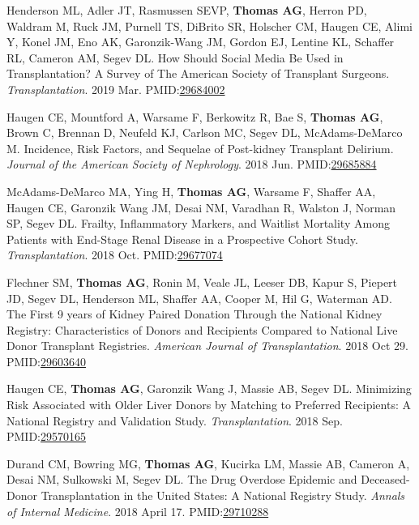 \documentclass[10pt]{article}
\makeatletter
\newlength{\bibhang}
\newlength{\bibsep}
 {\@listi \global\bibsep\itemsep \global\advance\bibsep by\parsep}
\newenvironment{bibenum*}
  {\renewcommand\labelenumi{[\theenumi]}%
   \etaremune[
     topsep=0pt,
     itemsep=\bibsep,
     parsep=0pt,partopsep=0pt,
     itemindent=-\bibhang,
     leftmargin={\bibhang+\widthof{[999]}}]}
  {\endetaremune}
\newcommand{\pmid}[1]{PMID:\href{https://www.ncbi.nlm.nih.gov/pubmed/#1}{#1}}
\makeatother
\begin{document}
\begin{bibenum*}
\item Henderson ML, Adler JT, Rasmussen SEVP, \textbf{Thomas AG},
  Herron PD, Waldram M, Ruck JM, Purnell TS, DiBrito SR, Holscher CM,
  Haugen CE, Alimi Y, Konel JM, Eno AK, Garonzik-Wang JM, Gordon EJ,
  Lentine KL, Schaffer RL, Cameron AM, Segev DL.
  How Should Social Media Be Used in Transplantation?
  A Survey of The American Society of Transplant Surgeons.
  \emph{Transplantation}. 2019 Mar.
  \pmid{29684002} 

\item Haugen CE, Mountford A, Warsame F, Berkowitz R, Bae S,
  \textbf{Thomas AG}, Brown C, Brennan D, Neufeld KJ, Carlson MC,
  Segev DL, McAdams-DeMarco M.
  Incidence, Risk Factors, and Sequelae of Post-kidney Transplant Delirium.
  \emph{Journal of the American Society of Nephrology}. 2018 Jun.
  \pmid{29685884} 

\item McAdams-DeMarco MA, Ying H, \textbf{Thomas AG}, Warsame F,
  Shaffer AA, Haugen CE, Garonzik Wang JM, Desai NM, Varadhan R,
  Walston J, Norman SP, Segev DL. Frailty, Inflammatory Markers, and
  Waitlist Mortality Among Patients with End-Stage Renal Disease in a
  Prospective Cohort Study.
  \emph{Transplantation}. 2018 Oct.
  \pmid{29677074} 

\item Flechner SM, \textbf{Thomas AG}, Ronin M,
  Veale JL, Leeser DB, Kapur S, Piepert JD, Segev DL, Henderson ML,
  Shaffer AA, Cooper M, Hil G, Waterman AD.
  The First 9 years of Kidney Paired Donation Through the National Kidney
  Registry: Characteristics of Donors and Recipients Compared to National Live
  Donor Transplant Registries.
  \emph{American Journal of Transplantation}. 2018 Oct 29.
  \pmid{29603640} 

\item Haugen CE, \textbf{Thomas AG}, Garonzik Wang J, Massie AB,
  Segev DL. Minimizing Risk Associated with Older Liver Donors by
  Matching to Preferred Recipients: A National Registry and
  Validation Study.
  \emph{Transplantation}. 2018 Sep.
  \\\pmid{29570165} 

\item Durand CM\dag, Bowring MG\dag, \textbf{Thomas AG}, Kucirka LM,
  Massie AB, Cameron A, Desai NM, Sulkowski M, Segev DL.
  The Drug Overdose Epidemic and Deceased-Donor Transplantation
  in the United States: A National Registry Study.
  \emph{Annals of Internal Medicine}. 2018 April 17.
  \pmid{29710288} 


\end{bibenum*}
\end{document}
